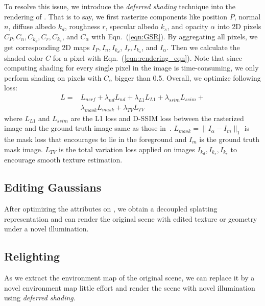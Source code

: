 To resolve this issue, we introduce the \textit{deferred shading} technique into the rendering of . 
That is to say, we first rasterize components like position $P$, normal $n$, diffuse albedo $k_d$, roughness $r$, specular albedo $k_s$, and opacity $\alpha$ into 2D pixels $C_{P}, C_{n}, C_{k_d}, C_{r}, C_{k_s}$, and $C_{\alpha}$ with Eqn.~(\ref{eqn:GSR}). 
By aggregating all pixels, we get corresponding 2D maps $I_{P}, I_{n}, I_{k_d}$, $I_{r}, I_{k_s}$, and $I_{\alpha}$. 
Then we calculate the shaded color $C$ for a pixel with Eqn.~(\ref{eqn:rendering_eqn}). 
Note that since computing shading for every single pixel in the image is time-consuming, we only perform shading on pixels with $C_{\alpha}$ bigger than 0.5. 
Overall, we optimize  following loss:
\begin{equation}
\label{eqn:total_loss}
\begin{aligned}
    L = &L_{nerf} + \lambda_{nd} L_{nd} + \lambda_{L1}L_{L1} + \lambda_{ssim}L_{ssim} +\\
    & \lambda_{mask}L_{mask} + \lambda_{TV} L_{TV}
\end{aligned}
\end{equation}
where $L_{L1}$ and $L_{ssim}$ are the L1 loss and D-SSIM loss between the rasterized image and the ground truth image same as those in~\cite{GS}. 
$L_{mask} = \|I_{\alpha} - I_m\|_1$ is the mask loss that encourages  to lie in the foreground and $I_m$ is the ground truth mask image. 
$L_{TV}$ is the total variation loss applied on images $I_{k_d}, I_{k_s}, I_{k_s}$ to encourage smooth texture estimation. 



\subsection{Editing  Gaussians}
\label{subsec:Edit}
After optimizing the attributes on , we obtain a decoupled  splatting representation and can render the original scene with edited texture or geometry under a novel illumination. 
\subsection{Relighting}
As we extract the environment map of the original scene, we can replace it by a novel environment map  little effort and render the scene with novel illumination using \textit{deferred shading}. 

